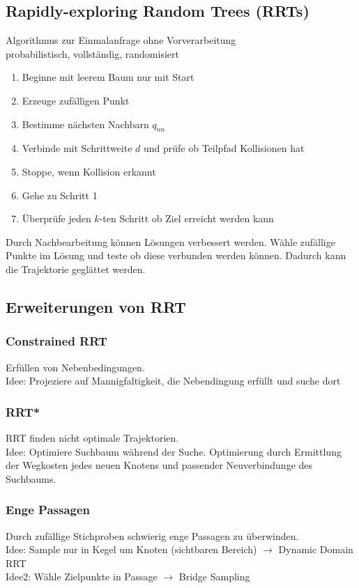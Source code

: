\subsection{Rapidly-exploring Random Trees (RRTs)}%
\label{bwp:sub:rapidly-exploring-random-trees}
Algorithmus zur Einmalanfrage ohne Vorverarbeitung\\
probabilistisch, vollständig, randomisiert

\begin{enumerate}
\item Beginne mit leerem Baum nur mit Start
\item Erzeuge zufälligen Punkt
\item Bestimme nächsten Nachbarn \(q_{nn}\)
\item Verbinde mit Schrittweite \(d\) und prüfe ob Teilpfad Kollisionen hat
\item Stoppe, wenn Kollision erkannt
\item Gehe zu Schritt 1
\item Überprüfe jeden \(k\)-ten Schritt ob Ziel erreicht werden kann
\end{enumerate}

Durch Nachbearbeitung können Lösungen verbessert werden. Wähle zufällige Punkte im Lösung und teste ob diese
verbunden werden können. Dadurch kann die Trajektorie geglättet werden.

\subsection{Erweiterungen von RRT}%
\label{bwp:sub:erweiterungen-von-rrt}
\subsubsection{Constrained RRT}%
\label{bwp:ssub:constrained-rrt}

Erfüllen von Nebenbedingungen.\\
Idee: Projeziere auf Mannigfaltigkeit, die Nebendingung erfüllt und suche dort

\subsubsection{RRT*}%
\label{bwp:ssub:rrt-stern}
RRT finden nicht optimale Trajektorien.\\
Idee: Optimiere Suchbaum während der Suche. Optimierung durch Ermittlung der Wegkosten jedes neuen Knotens und
passender Neuverbindunge des Suchbaums.

\subsubsection{Enge Passagen}%
\label{bwp:ssub:enge-passagen}
Durch zufällige Stichproben schwierig enge Passagen zu überwinden.\\
Idee: Sample nur in Kegel um Knoten (sichtbaren Bereich)
\(\rightarrow\) Dynamic Domain RRT\\

Idee2: Wähle Zielpunkte in Passage
\(\rightarrow\) Bridge Sampling\\

